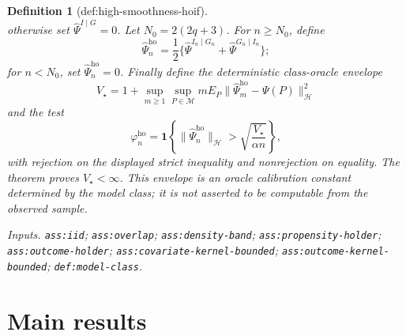 \documentclass{article}
\newtheorem{definition}{Definition}
\begin{document}
\begin{definition}[def:high-smoothness-hoif]
\[\]
otherwise set \(\widehat\Psi^{I\mid G}=0\).  Let \(N_0=2(2q+3)\).  For \(n\geq N_0\), define
\[
 \widehat\Psi_n^{\mathrm{ho}}
 =\frac12\{\widehat\Psi^{I_n\mid G_n}
                 +\widehat\Psi^{G_n\mid I_n}\};
\]
for \(n<N_0\), set \(\widehat\Psi_n^{\mathrm{ho}}=0\).  Finally define the deterministic class-oracle envelope
\[
 V_\star
 =1+\sup_{m\geq1}\sup_{P\in\mathcal M}
 mE_P\|\widehat\Psi_m^{\mathrm{ho}}-\Psi(P)\|_{\mathcal H}^2
\]
and the test
\[
 \varphi_n^{\mathrm{ho}}
 =\mathbf 1\left\{
 \|\widehat\Psi_n^{\mathrm{ho}}\|_{\mathcal H}
 >\sqrt{\frac{V_\star}{\alpha n}}
 \right\},
\]
with rejection on the displayed strict inequality and nonrejection on equality.  The theorem proves \(V_\star<\infty\).  This envelope is an oracle calibration constant determined by the model class; it is not asserted to be computable from the observed sample.
\par\smallskip\noindent\emph{Inputs.} \texttt{ass:\allowbreak{}iid}; \texttt{ass:\allowbreak{}overlap}; \texttt{ass:\allowbreak{}density-\allowbreak{}band}; \texttt{ass:\allowbreak{}propensity-\allowbreak{}holder}; \texttt{ass:\allowbreak{}outcome-\allowbreak{}holder}; \texttt{ass:\allowbreak{}covariate-\allowbreak{}kernel-\allowbreak{}bounded}; \texttt{ass:\allowbreak{}outcome-\allowbreak{}kernel-\allowbreak{}bounded}; \texttt{def:\allowbreak{}model-\allowbreak{}class}.
\end{definition}

\section{Main results}
\end{document}
